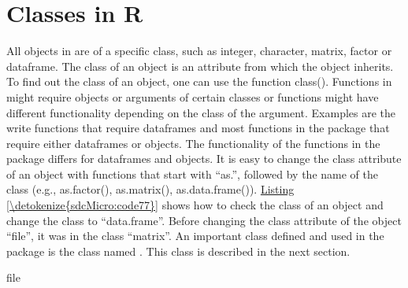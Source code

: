 \documentclass[letterpaper,10pt,english]{sphinxmanual}
\begin{document}
\section{Classes in R}
\label{\detokenize{sdcMicro:classes-in-r}}
All objects in  are of a specific class, such as integer, character,
matrix, factor or dataframe. The class of an object is an attribute from
which the object inherits. To find out the class of an object, one can
use the function class(). Functions in  might require objects or
arguments of certain classes or functions might have different
functionality depending on the class of the argument. Examples are the
write functions that require dataframes and most functions in the
 package that require either dataframes or  objects.
The functionality of the functions in the  package differs for
dataframes and  objects. It is easy to change the class
attribute of an object with functions that start with “as.”, followed by
the name of the class (e.g., as.factor(), as.matrix(), as.data.frame()).
\hyperref[\detokenize{sdcMicro:code77}]{Listing \ref{\detokenize{sdcMicro:code77}}} shows how to check the class of an object and change the
class to “data.frame”. Before changing the class attribute of the object
“file”, it was in the class “matrix”. An important class defined and
used in the  package is the class named . This
class is described in the next section.

\def\sphinxLiteralBlockLabel{\label{\detokenize{sdcMicro:code77}}}
%
\begin{sphinxVerbatim}[commandchars=\\\{\},numbers=left,firstnumber=1,stepnumber=1]

     file  

\end{sphinxVerbatim}
\end{document}
